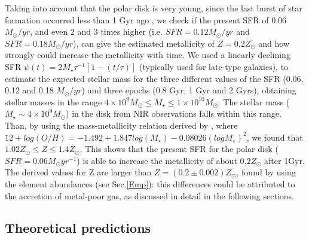 \documentclass[12pt,preprint]{aastex}
\begin{document}
Taking into account that the polar disk is very young, since the
  last burst of star formation occurred less than 1 Gyr ago
  \citep{Iod02}, we check if the present SFR of 0.06 $M_{\odot}/yr$,
  and even 2 and 3 times higher (i.e. $SFR = 0.12 M_{\odot}/yr$ and
  $SFR = 0.18 M_{\odot}/yr$), can give the estimated metallicity of
  $Z=0.2Z_{\odot}$ and how strongly could increase the metallicity
  with time.  We used a linearly declining SFR \citep{Bru03} $\psi(t)
  = 2M_{\star}\tau^{-1}[1-(t/\tau)]$ (typically used for late-type
  galaxies), to estimate the expected stellar mass for the three
  different values of the SFR (0.06, 0.12 and 0.18 $M_{\odot}/yr$) and
  three epochs (0.8 Gyr, 1 Gyr and 2 Gyrs), obtaining stellar masses
  in the range $4 \times 10^{9} M_{\odot} \leq M_{\star} \leq 1 \times
  10^{10} M_{\odot}$. The stellar
  mass ($M_{\star} \sim 4 \times 10^{9} M_{\odot}$) in the disk from
  NIR observations \citep{Iod02} falls within this range. Than, by using the
  mass-metallicity relation derived by \citet{Tre04}, where
  $12+log(O/H) = -1.492 + 1.847 log(M_{\star}) - 0.08026 (log
  M_{\star})^{2}$, we found that $1.02 Z_{\odot} \le Z \le 1.4
  Z_{\odot}$. This shows that the present SFR for the polar disk ($SFR
  = 0.06 M_{\odot} yr^{-1}$) is able to increase the metallicity of
  about $0.2 Z_{\odot}$ after 1Gyr. The derived values for Z are
  larger than $Z=(0.2 \pm 0.002) Z_{\odot}$, found by using the
  element abundances (see Sec.\ref{Emp}): this differences could be
  attributed to the accretion of metal-poor gas, as discussed in
  detail in the following sections.

\subsection{Theoretical predictions}\label{theory}
\end{document}
